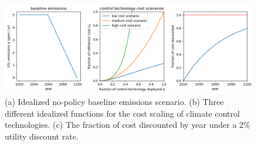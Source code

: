 \documentclass{article}
\begin{document}
\begin{figure}[htb!]
\noindent\includegraphics[width=1.0\textwidth]{figures/model_configuration.png}
\centering
\caption{(a) Idealized no-policy baseline emissions scenario. (b) Three different idealized functions for the cost scaling of climate control technologies. (c) The fraction of cost discounted by year under a 2\% utility discount rate.}
\label{fig-configuration}
\end{figure}

%
%
\end{document}
